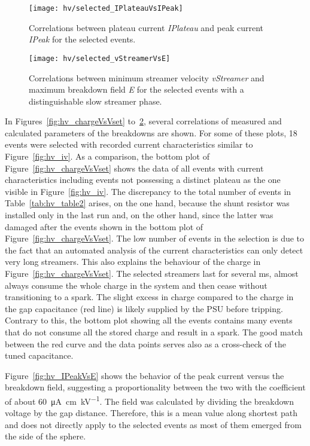 \begin{figure}[p]
	\centering
	\texttt{[image: hv/selected\_IPlateauVsIPeak]}
	\caption{Correlations between plateau current \emph{IPlateau} and peak current \emph{IPeak} for the selected events.}
	\label{fig:hv_IPlateauVsIPeak}
\end{figure}

\begin{figure}[p]
	\centering
	\texttt{[image: hv/selected\_vStreamerVsE]}
	\caption{Correlations between minimum streamer velocity \emph{vStreamer} and maximum breakdown field \emph{E} for the selected events with a distinguishable slow streamer phase.}
	\label{fig:hv_vStreamerVsE}
\end{figure}

In Figures~\ref{fig:hv_chargeVsVset} to~\ref{fig:hv_vStreamerVsE}, several correlations of measured and calculated parameters of the breakdowns are shown.
For some of these plots, \num{18} events were selected with recorded current characteristics similar to Figure~\ref{fig:hv_iv}.
As a comparison, the bottom plot of Figure~\ref{fig:hv_chargeVsVset} shows the data of all events with current characteristics including events not possessing a distinct plateau as the one visible in Figure~\ref{fig:hv_iv}.
The discrepancy to the total number of events in Table~\ref{tab:hv_table2} arises, on the one hand, because the shunt resistor was installed only in the last run and, on the other hand, since the latter was damaged after the events shown in the bottom plot of Figure~\ref{fig:hv_chargeVsVset}.
The low number of events in the selection is due to the fact that an automated analysis of the current characteristics can only detect very long streamers.
This also explains the behaviour of the charge in Figure~\ref{fig:hv_chargeVsVset}.
The selected streamers last for several \si{\milli\second}, almost always consume the whole charge in the system and then cease without transitioning to a spark.
The slight excess in charge compared to the charge in the gap capacitance (red line) is likely supplied by the PSU before tripping.
Contrary to this, the bottom plot showing all the events contains many events that do not consume all the stored charge and result in a spark.
The good match between the red curve and the data points serves also as a cross-check of the tuned capacitance.

Figure~\ref{fig:hv_IPeakVsE} shows the behavior of the peak current versus the breakdown field, suggesting a proportionality between the two with the coefficient of about \SI{60}{\micro\ampere\centi\metre\per\kilo\volt}.
The field was calculated by dividing the breakdown voltage by the gap distance.
Therefore, this is a mean value along shortest path and does not directly apply to the selected events as most of them emerged from the side of the sphere.

